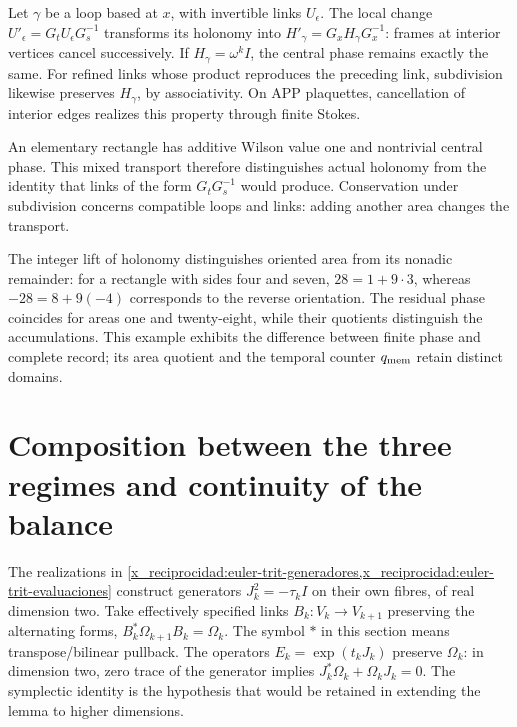 \begin{proposition}

Let \(\gamma\) be a loop based at \(x\), with invertible links \(U_\epsilon\). The local change \(U'_\epsilon=G_tU_\epsilon G_s^{-1}\) transforms its holonomy into \(H'_\gamma=G_xH_\gamma G_x^{-1}\): frames at interior vertices cancel successively. If \(H_\gamma=\omega^kI\), the central phase remains exactly the same. For refined links whose product reproduces the preceding link, subdivision likewise preserves \(H_\gamma\), by associativity. On APP plaquettes, cancellation of interior edges realizes this property through finite Stokes.
\end{proposition}

An elementary rectangle has additive Wilson value one and nontrivial central phase. This mixed transport therefore distinguishes actual holonomy from the identity that links of the form \(G_tG_s^{-1}\) would produce. Conservation under subdivision concerns compatible loops and links: adding another area changes the transport.

The integer lift of holonomy distinguishes oriented area from its nonadic remainder: for a rectangle with sides four and seven, \(28=1+9\cdot3\), whereas \(-28=8+9(-4)\) corresponds to the reverse orientation. The residual phase coincides for areas one and twenty-eight, while their quotients distinguish the accumulations. This example exhibits the difference between finite phase and complete record; its area quotient and the temporal counter \(q_{\rm mem}\) retain distinct domains.

\section{Composition between the three regimes and continuity of the balance}

The realizations in \cref{x_reciprocidad:euler-trit-generadores,x_reciprocidad:euler-trit-evaluaciones} construct generators \(J_k^2=-\tau_kI\) on their own fibres, of real dimension two. Take effectively specified links \(B_k:V_k\to V_{k+1}\) preserving the alternating forms, \(B_k^*\Omega_{k+1}B_k=\Omega_k\). The symbol \(*\) in this section means transpose/bilinear pullback. The operators \(E_k=\exp(t_kJ_k)\) preserve \(\Omega_k\): in dimension two, zero trace of the generator implies \(J_k^*\Omega_k+\Omega_kJ_k=0\). The symplectic identity is the hypothesis that would be retained in extending the lemma to higher dimensions.

